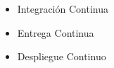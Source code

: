 \documentclass[preprint,12pt]{elsarticle}
\begin{document}
\begin{itemize}

\item Integración Continua


\item Entrega Continua


\item Despliegue Continuo


\end{itemize}
\end{document}
